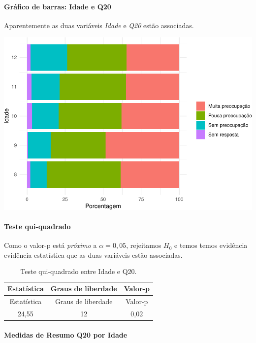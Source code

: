\documentclass[]{article}
\let\oldparagraph\paragraph
\renewcommand{\paragraph}[1]{\oldparagraph{#1}\mbox{}}
\begin{document}
\hypertarget{gruxe1fico-de-barras-idade-e-q20}{%
\paragraph{Gráfico de barras: Idade e Q20}\label{gruxe1fico-de-barras-idade-e-q20}}

Aparentemente as duas variáveis \emph{Idade} e \emph{Q20} estão associadas.

\begin{center}\includegraphics[width=0.75\linewidth]{relatorio_files/figure-latex/unnamed-chunk-303-1} \end{center}

\hypertarget{teste-qui-quadrado-34}{%
\paragraph{Teste qui-quadrado}\label{teste-qui-quadrado-34}}

Como o valor-p está \emph{próximo} a \(\alpha=0,05\), rejeitamos \(H_0\) e temos temos evidência evidência estatística que as duas variáveis estão associadas.

\begin{longtable}[]{@{}ccc@{}}
\caption{\label{tab:unnamed-chunk-304}Teste qui-quadrado entre Idade e Q20.}\tabularnewline
\toprule
Estatística & Graus de liberdade & Valor-p\tabularnewline
\midrule
\endfirsthead
\toprule
Estatística & Graus de liberdade & Valor-p\tabularnewline
\midrule
\endhead
24,55 & 12 & 0,02\tabularnewline
\bottomrule
\end{longtable}

\cleardoublepage

\hypertarget{medidas-de-resumo-q20-por-idade}{%
\paragraph{Medidas de Resumo Q20 por Idade}\label{medidas-de-resumo-q20-por-idade}}
\end{document}

